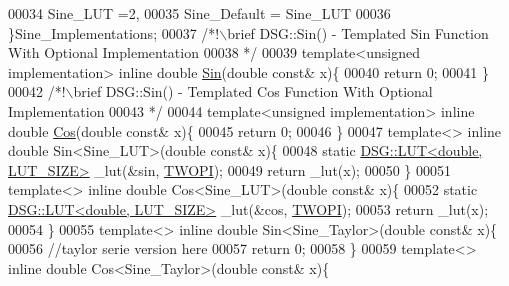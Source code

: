 \begin{DoxyCode}
00034             Sine\_LUT =2,
00035             Sine\_Default = Sine\_LUT
00036         \}Sine\_Implementations;\textcolor{comment}{}
00037 \textcolor{comment}{        /*!\(\backslash\)brief DSG::Sin() - Templated Sin Function With Optional Implementation}
00038 \textcolor{comment}{         */}
00039         \textcolor{keyword}{template}<\textcolor{keywordtype}{unsigned} implementation> \textcolor{keyword}{inline} \textcolor{keywordtype}{double} \hyperlink{namespace_d_s_g_aad63d316081c7d13a551acf346ee2749}{Sin}(\textcolor{keywordtype}{double} \textcolor{keyword}{const}& x)\{
00040             \textcolor{keywordflow}{return} 0;
00041         \}\textcolor{comment}{}
00042 \textcolor{comment}{        /*!\(\backslash\)brief DSG::Sin() - Templated Cos Function With Optional Implementation}
00043 \textcolor{comment}{         */}
00044         \textcolor{keyword}{template}<\textcolor{keywordtype}{unsigned} implementation> \textcolor{keyword}{inline} \textcolor{keywordtype}{double} \hyperlink{namespace_d_s_g_ade303ad15c77f534429305c3cbd90191}{Cos}(\textcolor{keywordtype}{double} \textcolor{keyword}{const}& x)\{
00045             \textcolor{keywordflow}{return} 0;
00046         \}
00047         \textcolor{keyword}{template}<> \textcolor{keyword}{inline} \textcolor{keywordtype}{double} Sin<Sine\_LUT>(\textcolor{keywordtype}{double} \textcolor{keyword}{const}& x)\{
00048             \textcolor{keyword}{static} \hyperlink{class_d_s_g_1_1_l_u_t}{DSG::LUT<double, LUT\_SIZE>} \_lut(&sin,
      \hyperlink{_p_i_8h_a4912c64aec0c943b7985db6cb61ff83a}{TWOPI});
00049             \textcolor{keywordflow}{return} \_lut(x);
00050         \}
00051         \textcolor{keyword}{template}<> \textcolor{keyword}{inline} \textcolor{keywordtype}{double} Cos<Sine\_LUT>(\textcolor{keywordtype}{double} \textcolor{keyword}{const}& x)\{
00052             \textcolor{keyword}{static} \hyperlink{class_d_s_g_1_1_l_u_t}{DSG::LUT<double, LUT\_SIZE>} \_lut(&cos,
      \hyperlink{_p_i_8h_a4912c64aec0c943b7985db6cb61ff83a}{TWOPI});
00053             \textcolor{keywordflow}{return} \_lut(x);
00054         \}
00055         \textcolor{keyword}{template}<> \textcolor{keyword}{inline} \textcolor{keywordtype}{double} Sin<Sine\_Taylor>(\textcolor{keywordtype}{double} \textcolor{keyword}{const}& x)\{
00056             \textcolor{comment}{//taylor serie version here}
00057             \textcolor{keywordflow}{return} 0;
00058         \}
00059         \textcolor{keyword}{template}<> \textcolor{keyword}{inline} \textcolor{keywordtype}{double} Cos<Sine\_Taylor>(\textcolor{keywordtype}{double} \textcolor{keyword}{const}& x)\{

\end{DoxyCode}

